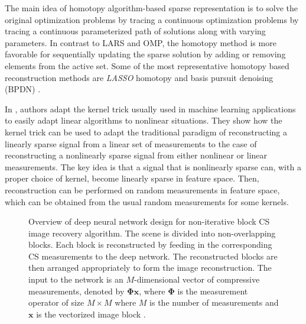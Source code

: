 \documentclass[journal]{IEEEtran}
\begin{document}
The main idea of homotopy algorithm-based sparse representation is to solve the original optimization problems by tracing a continuous optimization problems by tracing a continuous parameterized path of solutions along with varying parameters. In contrast to LARS and OMP, the homotopy method is more favorable for sequentially updating the sparse solution by adding or removing elements from the active set. Some of the most representative homotopy based reconstruction methods are \textit{LASSO} homotopy and basis pursuit denoising (BPDN) \cite{Zhang2015}.

In \cite{qi2011using}, authors adapt the kernel trick usually used in machine learning applications to easily adapt linear algorithms to nonlinear situations. They show how the kernel trick can be used to adapt the traditional paradigm of reconstructing a linearly sparse signal from a linear set of measurements to the case of reconstructing a nonlinearly sparse signal from either nonlinear or linear measurements. The key idea is that a signal that is nonlinearly sparse can, with a proper choice of kernel, become linearly sparse in feature space. Then, reconstruction can be performed on random measurements in feature space, which can be obtained from the usual random measurements for some kernels.
%
\begin{figure}[htbp]
	\centering
	
	\caption{Overview of deep neural network design for non-iterative block CS image recovery algorithm. The scene is divided into non-overlapping blocks. Each block is reconstructed by feeding in the corresponding CS measurements to the deep network. The reconstructed blocks are then arranged appropriately to form the image reconstruction. The input to the network is an $M$-dimensional vector of compressive measurements, denoted by $\boldsymbol{\Phi}\boldsymbol{x}$, where $\boldsymbol{\Phi}$ is the measurement operator of size $M \times M$ where $M$ is the number of measurements and $\boldsymbol{x}$ is the vectorized image block \cite{Kulkarni2016}.}
	
	\label{fig:reconnet}
\end{figure}
\end{document}
